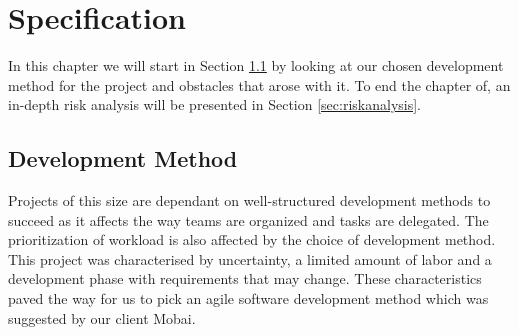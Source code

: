 \chapter{Specification}
\label{chap:Specification}
In this chapter we will start in Section \ref{sec:developmentmethod} by looking at our chosen development method for the project and obstacles that arose with it. To end the chapter of, an in-depth risk analysis will be presented in Section \ref{sec:riskanalysis}.

\section{Development Method}
\label{sec:developmentmethod}
Projects of this size are dependant on well-structured development methods to succeed as it affects the way teams are organized and tasks are delegated. The prioritization of workload is also affected by the choice of development method. This project was characterised by uncertainty, a limited amount of labor and a development phase with requirements that may change. These characteristics paved the way for us to pick an agile software development method which was suggested by our client Mobai.  

